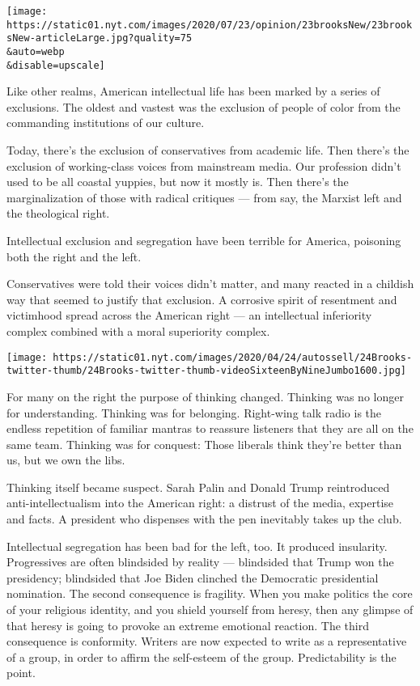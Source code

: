 \texttt{[image: https://static01.nyt.com/images/2020/07/23/opinion/23brooksNew/23brooksNew-articleLarge.jpg?quality=75\\\&auto=webp\\\&disable=upscale]}

Like other realms, American intellectual life has been marked by a
series of exclusions. The oldest and vastest was the exclusion of people
of color from the commanding institutions of our culture.

Today, there's the exclusion of conservatives from academic life. Then
there's the exclusion of working-class voices from mainstream media. Our
profession didn't used to be all coastal yuppies, but now it mostly is.
Then there's the marginalization of those with radical critiques ---
from say, the Marxist left and the theological right.

Intellectual exclusion and segregation have been terrible for America,
poisoning both the right and the left.

Conservatives were told their voices didn't matter, and many reacted in
a childish way that seemed to justify that exclusion. A corrosive spirit
of resentment and victimhood spread across the American right --- an
intellectual inferiority complex combined with a moral superiority
complex.

\texttt{[image: https://static01.nyt.com/images/2020/04/24/autossell/24Brooks-twitter-thumb/24Brooks-twitter-thumb-videoSixteenByNineJumbo1600.jpg]}

For many on the right the purpose of thinking changed. Thinking was no
longer for understanding. Thinking was for belonging. Right-wing talk
radio is the endless repetition of familiar mantras to reassure
listeners that they are all on the same team. Thinking was for conquest:
Those liberals think they're better than us, but we own the libs.

Thinking itself became suspect. Sarah Palin and Donald Trump
reintroduced anti-intellectualism into the American right: a distrust of
the media, expertise and facts. A president who dispenses with the pen
inevitably takes up the club.

Intellectual segregation has been bad for the left, too. It produced
insularity. Progressives are often blindsided by reality --- blindsided
that Trump won the presidency; blindsided that Joe Biden clinched the
Democratic presidential nomination. The second consequence is fragility.
When you make politics the core of your religious identity, and you
shield yourself from heresy, then any glimpse of that heresy is going to
provoke an extreme emotional reaction. The third consequence is
conformity. Writers are now expected to write as a representative of a
group, in order to affirm the self-esteem of the group. Predictability
is the point.

